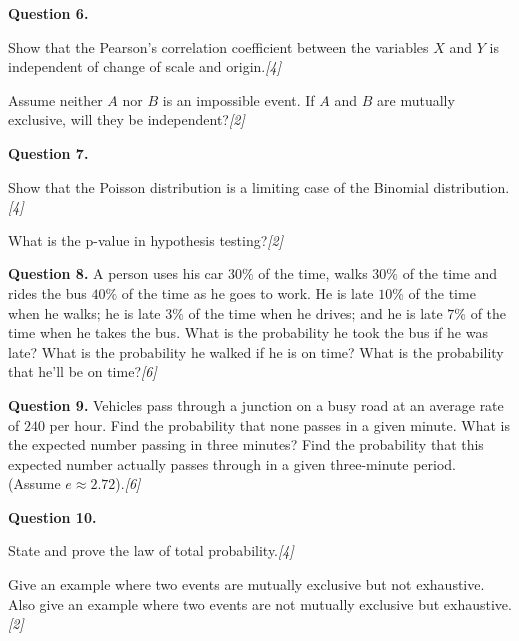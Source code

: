 \documentclass[11pt,a4paper]{article}
\newcommand{\pts}[1]{\hfill   \textit{[#1]}}
\begin{document}
\noindent   \textbf{Question 6.}

\begin{parts}
  \item Show that the Pearson's correlation coefficient between the variables $X$ and $Y$ is independent of change of scale and origin.\pts{4}
  \item Assume neither $A$ nor $B$ is an impossible event. If $A$ and $B$ are mutually exclusive, will they be independent?\pts{2}
\end{parts}

\medskip


\noindent   \textbf{Question 7.}

\begin{parts}
  \item Show that the Poisson distribution is a limiting case of the Binomial distribution.\pts{4}
  \item What is the p-value in hypothesis testing?\pts{2}
\end{parts}

\medskip


\noindent   \textbf{Question 8.} A person uses his car $30\%$ of the time, walks $30\%$ of the time and rides the bus $40\%$ of the time as he goes to work. He is late $10\%$ of the time when he walks; he is late $3\%$ of the time when he drives; and he is late $7\%$ of the time when he takes the bus. What is the probability he took the bus if he was late? What is the probability he walked if he is on time? What is the probability that he'll be on time?\pts{6}

\medskip


\noindent   \textbf{Question 9.} Vehicles pass through a junction on a busy road at an average rate of $240$ per hour. Find the probability that none passes in a given minute. What is the expected number passing in three minutes? Find the probability that this expected number actually passes through in a given three-minute period. (Assume $e \approx 2.72$).\pts{6}

\medskip


\noindent   \textbf{Question 10.}

\begin{parts}
  \item State and prove the law of total probability.\pts{4}
  \item Give an example where two events are mutually exclusive but not exhaustive. Also give an example where two events are not mutually exclusive but exhaustive.\pts{2}
\end{parts}
\end{document}
